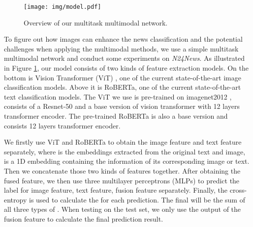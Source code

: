 \documentclass[10pt, a4paper]{article}
\begin{document}
\begin{figure}[]
    \centering
    \texttt{[image: img/model.pdf]}
    \caption{Overview of our multitask multimodal network.}
    \label{fig:mlp}
\end{figure}

To figure out how images can enhance the news classification and the potential challenges when applying the multimodal methods, we use a simple multitask multimodal network and conduct some experiments on \textit{N24News}.
As illustrated in Figure \ref{fig:mlp}, our model consists of two kinds of feature extraction models. On the bottom is Vision Transformer (ViT) \cite{dosovitskiy2020image}, one of the current state-of-the-art image classification models. Above it is RoBERTa\cite{liu2019roberta}, one of the current state-of-the-art text classification models. The ViT we use is pre-trained on imagenet2012 \cite{krizhevsky2012imagenet}, consists of a Resnet-50 and a base version of vision transformer with 12 layers transformer encoder. The pre-trained RoBERTa is also a base version and consists 12 layers transformer encoder.

We firstly use ViT and RoBERTa to obtain the image feature and text feature separately, where  is the embeddings extracted from the original text and image,  is a 1D embedding containing the information of its corresponding image or text. Then we concatenate those two kinds of features together. After obtaining the fused feature, we then use three multilayer perceptrons (MLPs) to predict the label for image feature, text feature, fusion feature separately. Finally, the cross-entropy is used to calculate the  for each prediction. The final  will be the sum of all three types of . When testing on the test set, we only use the output of the fusion feature to calculate the final prediction result.
\end{document}
